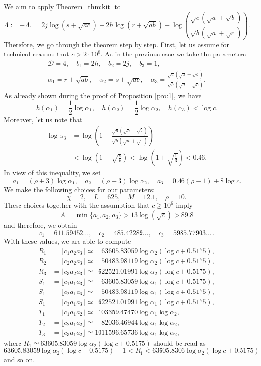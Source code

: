 \documentclass{amsart}
\theoremstyle{definition}
\begin{document}
We aim to apply Theorem~\ref{thm:kit} to 
$$
\Lambda:=-\Lambda_1 = 2j \log(s+\sqrt{ac}) -2h \log(r+\sqrt{ab})-  \log \left(\frac{\sqrt{c}(\sqrt{a}+\sqrt{b})}{\sqrt{b}(\sqrt{a}+\sqrt{c})}\right).
$$
Therefore, we go through the theorem step by step. First, let us assume for technical reasons that $c>2\cdot 10^{8}$. As in the previous case we
take the parameters
\begin{gather*}
 \mathcal{D}=4,\quad  b_1=2h,\quad b_2=2j,\quad b_3=1,\\
\alpha_1= r+\sqrt{ab},\quad  \alpha_2 = s+\sqrt{ac}, \quad \alpha_3= \frac{\sqrt{c}(\sqrt{a}+\sqrt{b})}{\sqrt{b}(\sqrt{a}+\sqrt{c})} .
\end{gather*}
As already shown during the proof of Proposition \ref{pro:1}, we have
$$
h(\alpha_1) = \frac{1}{2}\log \alpha_1, \quad h(\alpha_2) = \frac{1}{2}\log \alpha_2, \quad  h(\alpha_3)<\log c.
$$ 
Moreover, let us note that
\begin{align*}
\log \alpha_3 &= \log \left(1+\frac{\sqrt{a}(\sqrt{c}-\sqrt{b})}{\sqrt{b}(\sqrt{a}+\sqrt{c})}\right)\\
&<\log\left(1+\sqrt{\frac{a}{b}}\right)<\log\left(1+\sqrt{\frac 13}\right)<0.46.  
\end{align*}
In view of this inequality, we set
$$
a_1 = (\rho+3)\log \alpha_1, \quad a_2 =(\rho+3)\log \alpha_2,\quad  a_3= 0.46(\rho-1)+8\log c.
$$
We make the following choices for our parameters:
$$\chi=2,\quad L=625,\quad M=12.1, \quad \rho=10.$$
These choices together with the assumption that $c\geq 10^6$ imply
$$A=\min\{a_1,a_2,a_3\}>13\log(\sqrt c)>89.8$$
and therefore, we obtain
$$c_1=611.59452\dots,\quad c_2=485.42289\dots,\quad c_3=5985.77903\dots\, .$$
With these values, we are able to compute
\begin{align*}
R_1 &= \lfloor c_1a_2a_3\rfloor \simeq \phantom{00}63605.83059\log\alpha_2(\log c+0.5175),\\ 
R_2 &= \lfloor c_2a_2a_3\rfloor \simeq \phantom{00}50483.98119\log\alpha_2(\log c+0.5175),\\ 
R_3 &= \lfloor c_3a_2a_3\rfloor \simeq \phantom{0}622521.01991\log\alpha_2(\log c+0.5175),\\ 
S_1 &= \lfloor c_1a_1a_3\rfloor \simeq \phantom{00}63605.83059\log\alpha_1(\log c+0.5175),\\ 
S_1 &= \lfloor c_2a_1a_3\rfloor \simeq \phantom{00}50483.98119\log\alpha_1(\log c+0.5175),\\ 
S_1 &= \lfloor c_3a_1a_3\rfloor \simeq \phantom{0}622521.01991\log\alpha_1(\log c+0.5175),\\ 
T_1 &= \lfloor c_1a_1a_2\rfloor \simeq \phantom{0}103359.47470\log\alpha_1\log\alpha_2,\\ 
T_2 &= \lfloor c_2a_1a_2\rfloor \simeq \phantom{00}82036.46944\log\alpha_1\log\alpha_2,\\ 
T_3 &= \lfloor c_3a_1a_2\rfloor \simeq 1011596.65736\log\alpha_1\log\alpha_2,
\end{align*}
where $R_1\simeq 63605.83059\log\alpha_2(\log c+0.5175) $ should be read as
$$63605.83059\log\alpha_2(\log c+0.5175)-1<R_1<63605.8306\log\alpha_2(\log c+0.5175)$$
and so on.
\end{document}
